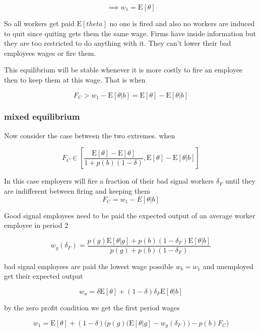 \documentclass[11pt]{article}
\newcommand{\E}{\mathrm{E}}
\begin{document}
$$ \implies w_1 = \E[\theta]$$

So all workers get paid $\E[theta]$ no one is fired and also no workers are induced to quit since quiting gets them the same wage. Firms have inside information but they are too restricted to do anything with it. They can't lower their bad employees wages or fire them. \par 

This equilibrium will be stable whenever it is more costly to fire an employee then to keep them at this wage. That is when 

$$ F_C >  w_1 - \E[\theta|b] = \E[\theta] - \E[\theta|b]$$


\subsubsection{mixed equilibrium}

Now consider the case between the two extremes. when 

$$ F_C \in \left[  \frac{\E[\theta] - \E[\theta]}{1 + p(b)(1-\delta)} , \E[\theta] - \E[\theta|b] \right] $$

In this case employers will fire a fraction of their bad signal workers $\delta_F$ until they are indifferent between firing and keeping them 
$$  F_C = w_1 - E[\theta|b]$$ 

Good signal employees need to be paid the expected output of an average worker employee in period 2 

$$ w_g(\delta_F) = \frac{p(g)\E[\theta|g] + p(b)(1-\delta_F) \E[\theta|b] }{p(g) + p(b)(1-\delta_F)} $$

bad signal employees are paid the lowest wage possible $ w_b = w_1$ and unemployed get their expected output 

$$ w_u = \delta\E[\theta] + (1-\delta)\delta_F\E[\theta | b]$$

by the zero profit condition we get the first period wages 

$$w_1 = \E[\theta] + (1-\delta)  \bigg( p(g) \Big(\E[\theta|g] - w_g(\delta_F)  \Big) - p(b)F_C  \bigg) $$

















\end{document}

